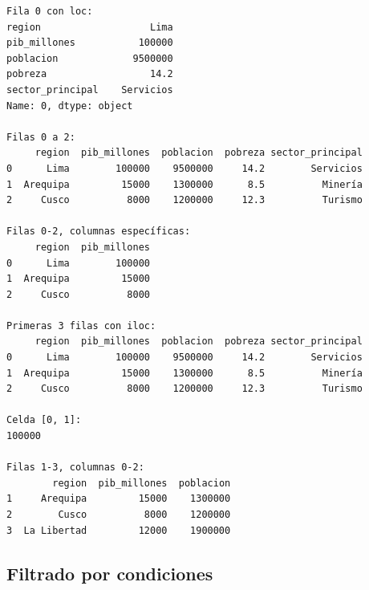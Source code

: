 \documentclass[
  doc,
  floatsintext,
  longtable,
  a4paper,
  nolmodern,
  notxfonts,
  notimes,
  12pt,
  colorlinks=true,linkcolor=blue,citecolor=blue,urlcolor=blue]{apa7}
\begin{document}
\begin{verbatim}
Fila 0 con loc:
region                   Lima
pib_millones           100000
poblacion             9500000
pobreza                  14.2
sector_principal    Servicios
Name: 0, dtype: object

Filas 0 a 2:
     region  pib_millones  poblacion  pobreza sector_principal
0      Lima        100000    9500000     14.2        Servicios
1  Arequipa         15000    1300000      8.5          Minería
2     Cusco          8000    1200000     12.3          Turismo

Filas 0-2, columnas específicas:
     region  pib_millones
0      Lima        100000
1  Arequipa         15000
2     Cusco          8000

Primeras 3 filas con iloc:
     region  pib_millones  poblacion  pobreza sector_principal
0      Lima        100000    9500000     14.2        Servicios
1  Arequipa         15000    1300000      8.5          Minería
2     Cusco          8000    1200000     12.3          Turismo

Celda [0, 1]:
100000

Filas 1-3, columnas 0-2:
        region  pib_millones  poblacion
1     Arequipa         15000    1300000
2        Cusco          8000    1200000
3  La Libertad         12000    1900000
\end{verbatim}

\subsection{Filtrado por condiciones}\label{filtrado-por-condiciones}
\end{document}
